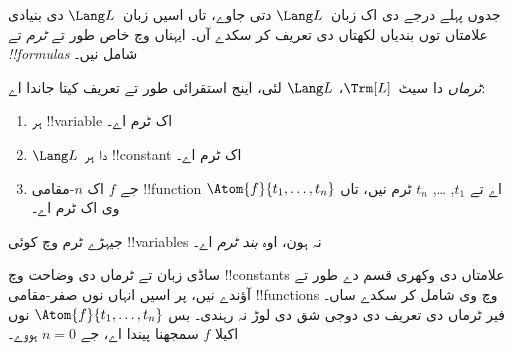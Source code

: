 \documentclass[../../../include/open-logic-section]{subfiles}
\begin{document}


جدوں پہلے درجے دی اک زبان~$\Lang L$ دتی جاوے، تاں اسیں
زبان~$\Lang L$ دی بنیادی علامتاں توں بندیاں لکھتاں دی تعریف کر سکدے آں۔
ایہناں وچ خاص طور تے \emph{ٹرم} تے \emph{!!{formula}s} شامل نیں۔

\begin{defn}[ٹرم]
\emph{ٹرماں} دا سیٹ~$\Trm[L]$، $\Lang L$ لئی، اینج
استقرائی طور تے تعریف کیتا جاندا اے:
\begin{enumerate}
\item ہر !!{variable} اک ٹرم اے۔
\item $\Lang L$ دا ہر !!{constant} اک ٹرم اے۔
\item جے $f$ اک $n$-مقامی !!{function} اے تے $t_1$, \dots, $t_n$
  ٹرم نیں، تاں $\Atom{f}{t_1, \ldots, t_n}$ وی اک ٹرم اے۔
\end{enumerate}
جیہڑے ٹرم وچ کوئی !!{variable}s نہ ہون، اوہ \emph{بند ٹرم} اے۔
\end{defn}

\begin{explain}
ساڈی زبان تے ٹرماں دی وضاحت وچ !!{constant}s علامتاں دی
وکھری قسم دے طور تے آؤندے نیں، پر اسیں انہاں نوں
صفر-مقامی !!{function}s وچ وی شامل کر سکدے ساں۔ فیر
ٹرماں دی تعریف دی دوجی شق دی لوڑ نہ رہندی۔ بس
$\Atom{f}{t_1, \ldots, t_n}$ نوں اکیلا $f$
سمجھنا پیندا اے، جے $n =
0$ ہووے۔
\end{explain}
\end{document}

